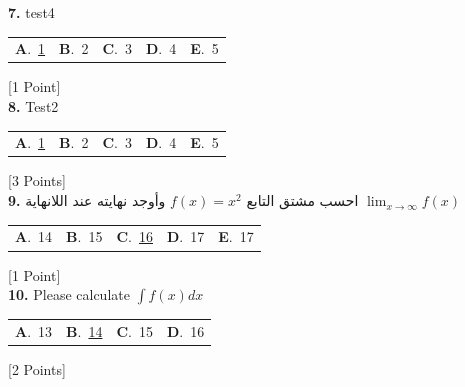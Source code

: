 \documentclass[12pt]{article}
\newcommand{\choice}[2]{\textbf{#1}.~#2}
\begin{document}
\noindent \textbf{\textenglish{7.}} {\textenglish{test4}}

\begin{tabularx}{\linewidth}{@{}*{5}{Y}@{}}
\choice{A}{{\underline{{\textenglish{1}}}}} & \choice{B}{{{\textenglish{2}}}} & \choice{C}{{{\textenglish{3}}}} & \choice{D}{{{\textenglish{4}}}} & \choice{E}{{{\textenglish{5}}}} \\
\end{tabularx}
\hfill {\textenglish{[1 Point]}}\\[0.5em]

\noindent \textbf{\textenglish{8.}} {\textenglish{Test2}}

\begin{tabularx}{\linewidth}{@{}*{5}{Y}@{}}
\choice{A}{{\underline{{\textenglish{1}}}}} & \choice{B}{{{\textenglish{2}}}} & \choice{C}{{{\textenglish{3}}}} & \choice{D}{{{\textenglish{4}}}} & \choice{E}{{{\textenglish{5}}}} \\
\end{tabularx}
\hfill {\textenglish{[3 Points]}}\\[0.5em]

\noindent \textbf{\textenglish{9.}} {\textarabic{احسب مشتق التابع }}\( f(x) = x^2\){\textarabic{ وأوجد نهايته عند اللانهاية }}\(\lim_{x \to \infty}f(x)\)

\begin{tabularx}{\linewidth}{@{}*{5}{Y}@{}}
\choice{A}{{{\textenglish{14}}}} & \choice{B}{{{\textenglish{15}}}} & \choice{C}{{\underline{{\textenglish{16}}}}} & \choice{D}{{{\textenglish{17}}}} & \choice{E}{{{\textenglish{17}}}} \\
\end{tabularx}
\hfill {\textenglish{[1 Point]}}\\[0.5em]

\noindent \textbf{\textenglish{10.}} {\textenglish{Please calculate }}\(\int f(x)dx\)

\begin{tabularx}{\linewidth}{@{}*{4}{Y}@{}}
\choice{A}{{{\textenglish{13}}}} & \choice{B}{{\underline{{\textenglish{14}}}}} & \choice{C}{{{\textenglish{15}}}} & \choice{D}{{{\textenglish{16}}}} \\
\end{tabularx}
\hfill {\textenglish{[2 Points]}}\\[0.5em]
\end{document}
